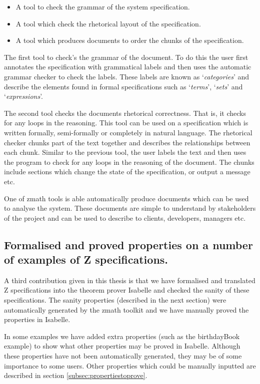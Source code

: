 \begin{itemize}
\item A tool to check the grammar of the system specification.

\item A tool which check the rhetorical layout of the specification.

\item A tool which produces documents to order the chunks of the specification.
\end{itemize}

The first tool to check's the grammar of the document. To do this the user first
annotates the specification with grammatical labels and then uses the automatic
grammar checker to check the labels. These labels are known as
`\emph{categories}' and describe the elements found in formal specifications
such as `\emph{terms}', `\emph{sets}' and `\emph{expressions}'. 

The second tool checks the documents rhetorical correctness. That is, it checks
for any loops in the reasoning. This tool can be used on a specification which
is written formally, semi-formally or completely in natural language. The
rhetorical checker chunks part of the text together and describes the
relationships between each chunk. Similar to the previous tool, the user labels
the text and then uses the program to check for any loops in the reasoning of
the document. The chunks include sections which change the state of the
specification, or output a message etc.

One of \gls{zmath} tools is able automatically produce documents which can be
used to analyse the system. These documents are simple to understand by
stakeholders of the project and can be used to describe to clients, developers,
managers etc. 

\subsection{Formalised and proved properties on a number of examples of Z specifications.}

A third contribution given in this thesis is that we have formalised and
translated Z specifications into the theorem prover Isabelle and checked the
sanity of these specifications. The sanity properties (described in the next
section) were automatically generated by the \gls{zmath} toolkit and we have
manually proved the properties in Isabelle.

In some examples we have added extra properties (such as the birthdayBook
example) to show what other properties may be proved in Isabelle. Although these
properties have not been automatically generated, they may be of some importance
to some users. Other properties which could be manually inputted are described
in section \ref{subsec:propertiestoprove}.

